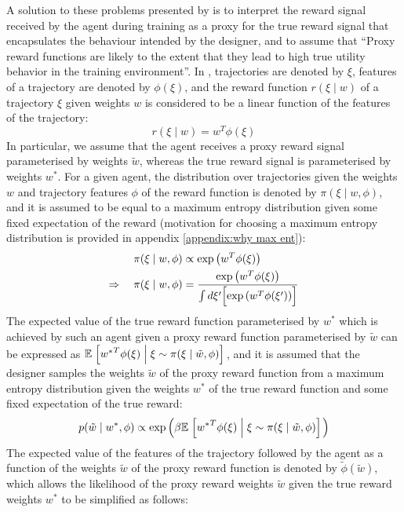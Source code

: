 A solution to these problems presented by \cite{hadfield2017inverse} is to interpret the reward signal received by the agent during training as a proxy for the true reward signal that encapsulates the behaviour intended by the designer, and to assume that ``Proxy reward functions are likely to the extent that they lead to high true utility behavior in the training environment''. In \cite{hadfield2017inverse}, trajectories are denoted by $\xi$, features of a trajectory are denoted by $\phi(\xi)$, and the reward function $r(\xi\mid w)$ of a trajectory $\xi$ given weights $w$ is considered to be a linear function of the features of the trajectory:
\begin{equation*}
    r(\xi\mid w) = w^T \phi(\xi)
\end{equation*}
In particular, we assume that the agent receives a proxy reward signal parameterised by weights $\tilde{w}$, whereas the true reward signal is parameterised by weights $w^*$. For a given agent, the distribution over trajectories given the weights $w$ and trajectory features $\phi$ of the reward function is denoted by $\pi(\xi\mid w, \phi)$, and it is assumed to be equal to a maximum entropy distribution given some fixed expectation of the reward (motivation for choosing a maximum entropy distribution is provided in appendix \ref{appendix:why max ent}):
\begin{align*}
    \pi(\xi\mid w, \phi) &\propto \exp\left( w^T \phi(\xi) \right) \\
    \Rightarrow \quad \pi(\xi\mid w, \phi) &= \frac{\exp\left( w^T \phi(\xi) \right)}{\int{ d\xi'\Bigl[ \exp\left( w^T \phi(\xi') \right) \Bigr]}}
\end{align*}
The expected value of the true reward function parameterised by $w^*$ which is achieved by such an agent given a proxy reward function parameterised by $\tilde{w}$ can be expressed as $\mathbb{E}\left. \Bigl[ {w^*}^T\phi(\xi) \;\middle\vert\; \xi \sim \pi(\xi\mid \tilde{w}, \phi) \Bigr] \right.$, and it is assumed that the designer samples the weights $\tilde{w}$ of the proxy reward function from a maximum entropy distribution given the weights $w^*$ of the true reward function and some fixed expectation of the true reward:
\begin{equation*}
    p(\tilde{w} \mid w^*, \phi) \propto \exp\left( \beta\mathbb{E}\left. \Bigl[ {w^*}^T\phi(\xi) \;\middle\vert\; \xi \sim \pi(\xi\mid \tilde{w}, \phi) \Bigr] \right. \right)
\end{equation*}
The expected value of the features of the trajectory followed by the agent as a function of the weights $\tilde{w}$ of the proxy reward function is denoted by $\tilde{\phi}(\tilde{w})$, which allows the likelihood of the proxy reward weights $\tilde{w}$ given the true reward weights $w^*$ to be simplified as follows:
